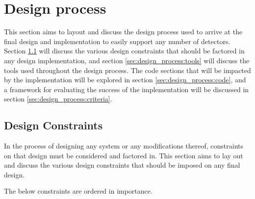 \documentclass{article}
\begin{document}
\section{Design process} \label{sec:design_process}

This section aims to layout and discuss the design process used to arrive at the final design and implementation to easily support any number of detectors.
Section \ref{sec:design_process:constraints} will discuss the various design constraints that should be factored in any design implementation, and section \ref{sec:design_process:tools} will discuss the tools used throughout the design process.
The code sections that will be impacted by the implementation will be explored in section \ref{sec:design_process:code}, and a framework for evaluating the success of the implementation will be discussed in section \ref{sec:design_process:criteria}.

\subsection{Design Constraints} \label{sec:design_process:constraints}

In the process of designing any system or any modifications thereof, constraints on that design must be considered and factored in.
This section aims to lay out and discuss the various design constraints that should be imposed on any final design.

The below constraints are ordered in importance.
\end{document}
